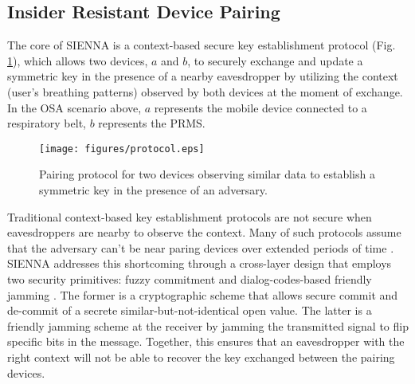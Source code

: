 \subsection{Insider Resistant Device Pairing}
\label{section:key evolution}
The core of SIENNA is a context-based secure key establishment protocol (Fig. \ref{fig:key evolution_diag}), which allows two devices, $a$ and $b$, to securely exchange and update a symmetric key in the presence of a nearby eavesdropper by utilizing the context (user's breathing patterns) observed by both devices at the moment of exchange. In the OSA scenario above, $a$ represents the mobile device connected to a respiratory belt, $b$ represents the PRMS.

\begin{figure}[h]
\centering
\texttt{[image: figures/protocol.eps]}
\caption{Pairing protocol for two devices observing similar data to establish a symmetric key in the presence of an adversary.}
\label{fig:key evolution_diag}
\end{figure}



Traditional context-based key establishment protocols are not secure when eavesdroppers are nearby to observe the context. Many of such protocols assume that the adversary can't be near paring devices over extended periods of time \cite{MiettinenContextBasedZeroInteractionPairing2014}. SIENNA addresses this shortcoming through a cross-layer design that employs two security primitives: fuzzy commitment \cite{JuelsFuzzyCommitmentScheme1999} and dialog-codes-based friendly jamming \cite{AroraDialogCodesSecure2009,GollakotaPhysicalLayerWireless2011, MelcherIJamChannelRandomization2020}. The former is a cryptographic scheme that allows secure commit and de-commit of a secrete similar-but-not-identical open value. The latter is a friendly jamming scheme at the receiver by jamming the transmitted signal to flip specific bits in the message. Together, this ensures that an eavesdropper with the right context will not be able to recover the key exchanged between the pairing devices.

